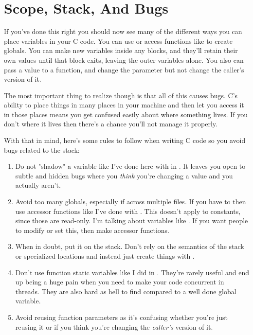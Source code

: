 \section{Scope, Stack, And Bugs}

If you've done this right you should now see many of the different ways
you can place variables in your C code.  You can use  or
access functions like  to create globals.  You can make
new variables inside any blocks, and they'll retain their own values until
that block exits, leaving the outer variables alone.  You also can pass
a value to a function, and change the parameter but not change the caller's
version of it.

The most important thing to realize though is that all of this causes
bugs.  C's ability to place things in many places in your machine and then
let you access it in those places means you get confused easily about
where something lives.  If you don't where it lives then there's a chance
you'll not manage it properly.

With that in mind, here's some rules to follow when writing C code
so you avoid bugs related to the stack:

\begin{enumerate}
\item Do not "shadow" a variable like I've done here with 
    in .  It leaves you open to subtle and hidden bugs
    where you \emph{think} you're changing a value and you actually aren't.
\item Avoid too many globals, especially if across multiple files.  If you have
    to then use accessor functions like I've done with .  This
    doesn't apply to constants, since those are read-only.  I'm talking about
    variables like .  If you want people to modify or set this,
    then make accessor functions.
\item When in doubt, put it on the stack.  Don't rely on the semantics of the
    stack or specialized locations and instead just create things with
    .
\item Don't use function static variables like I did in .
    They're rarely useful and end up being a huge pain when you need to make
    your code concurrent in threads.  They are also hard as hell to find compared
    to a well done global variable.
\item Avoid reusing function parameters as it's confusing whether you're 
    just reusing it or if you think you're changing the \emph{caller's}
    version of it.
\end{enumerate}

